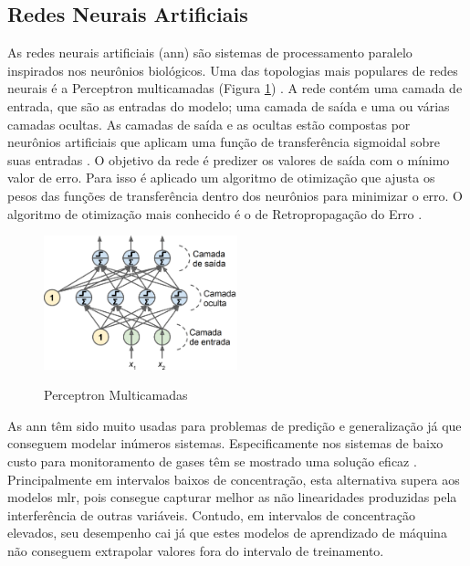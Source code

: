 \subsection{Redes Neurais Artificiais}

As redes neurais artificiais (\gls{ann}) são sistemas de processamento paralelo inspirados nos neurônios biológicos. Uma das topologias mais populares de redes neurais é a Perceptron multicamadas (Figura \ref{fig:monit-calib-mlp-structure}) \cite{geron2019maos}. A rede contém uma camada de entrada, que são as entradas do modelo; uma camada de saída e uma ou várias camadas ocultas. As camadas de saída e as ocultas estão compostas por neurônios artificiais que aplicam uma função de transferência sigmoidal sobre suas entradas \cite{Feng2019ReviewTechnology}. O objetivo da rede é predizer os valores de saída com o mínimo valor de erro. Para isso é aplicado um algoritmo de otimização que ajusta os pesos das funções de transferência dentro dos neurônios para minimizar o erro. O algoritmo de otimização mais conhecido é o de Retropropagação do Erro \cite{geron2019maos}.

\begin{figure}[h]
    \centering
    \caption{Perceptron Multicamadas}
    \includegraphics[width=0.5\textwidth]{chapters/1-MONITORAMENTO/Figuras/MLP_PT.png}
    \label{fig:monit-calib-mlp-structure}
\end{figure}

As \gls{ann} têm sido muito usadas para problemas de predição e generalização já que conseguem modelar inúmeros sistemas. Especificamente nos sistemas de baixo custo para monitoramento de gases têm se mostrado uma solução eficaz \cite{Spinelle2015FieldDioxide,Spinelle2017FieldCO2,DeVito2018CalibratingApproaches}. Principalmente em intervalos baixos de concentração, esta alternativa supera aos modelos \gls{mlr}, pois consegue capturar melhor as não linearidades produzidas pela interferência de outras variáveis. Contudo, em intervalos de concentração elevados, seu desempenho cai já que estes modelos de aprendizado de máquina não conseguem extrapolar valores fora do intervalo de treinamento.

